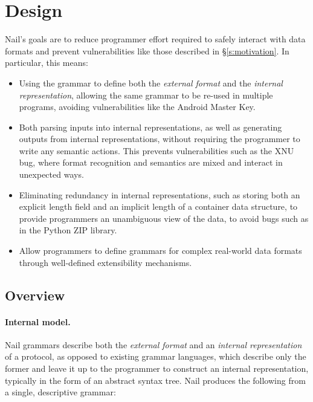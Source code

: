 \section{Design}
\label{s:design}

Nail's goals are to reduce programmer effort required to safely interact with data formats and
prevent vulnerabilities like those described in \S\ref{s:motivation}. In particular, this means:

\begin{itemize}


\item Using the grammar to define both the \emph{external format} and the \emph{internal
    representation}, allowing the same grammar to be re-used in multiple programs, avoiding
  vulnerabilities like the Android Master Key.

\item Both parsing inputs into internal representations, as well as
      generating outputs from internal representations, without
      requiring the programmer to write any semantic actions. This prevents
      vulnerabilities such as the XNU bug, where format recognition and semantics
      are mixed and interact in unexpected ways.

\item Eliminating redundancy in internal representations, such as
      storing both an explicit length field and an implicit length
      of a container data structure, to provide programmers
      an unambiguous view of the data, to avoid bugs such as in the Python ZIP library.

\item Allow programmers to define grammars for complex real-world
      data formats through well-defined extensibility mechanisms. 

\end{itemize}

\subsection{Overview}

\paragraph{Internal model.}

Nail grammars describe both the \emph{external format} and an
\emph{internal representation} of a protocol, as opposed to existing
grammar languages, which describe only the former and leave it up to
the programmer to construct an internal representation, typically in
the form of an abstract syntax tree.
Nail produces the following from a single, descriptive grammar: 

